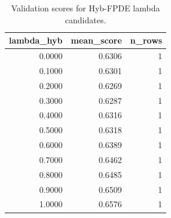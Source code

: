 \begin{table}[t]
\caption{Validation scores for Hyb-FPDE lambda candidates.}
\label{tab:lambda_distribution_computed}
\centering
\begin{tabular}{rrr}
\toprule
lambda\_hyb & mean\_score & n\_rows \\
\midrule
0.0000 & 0.6306 & 1 \\
0.1000 & 0.6301 & 1 \\
0.2000 & 0.6269 & 1 \\
0.3000 & 0.6287 & 1 \\
0.4000 & 0.6316 & 1 \\
0.5000 & 0.6318 & 1 \\
0.6000 & 0.6389 & 1 \\
0.7000 & 0.6462 & 1 \\
0.8000 & 0.6485 & 1 \\
0.9000 & 0.6509 & 1 \\
1.0000 & 0.6576 & 1 \\
\bottomrule
\end{tabular}

\end{table}
